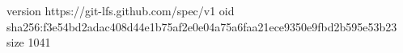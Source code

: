 version https://git-lfs.github.com/spec/v1
oid sha256:f3e54bd2adac408d44e1b75af2e0e04a75a6faa21ece9350e9fbd2b595e53b23
size 1041

